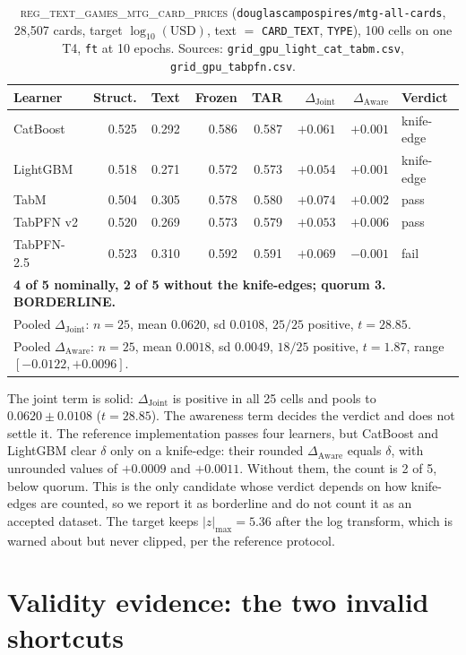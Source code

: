 \documentclass{article}
\newcommand{\djoint}{\Delta_{\text{Joint}}}
\newcommand{\daware}{\Delta_{\text{Aware}}}
\begin{document}
\begin{table}[H]
\centering\small
\caption{\textsc{reg\_text\_games\_mtg\_card\_prices} (\texttt{douglascampospires/mtg-all-cards},
28{,}507 cards, target $\log_{10}(\text{USD})$, text $=$ \texttt{CARD\_TEXT}, \texttt{TYPE}),
100 cells on one T4, \texttt{ft} at 10 epochs. Sources: \texttt{grid\_gpu\_light\_cat\_tabm.csv},
\texttt{grid\_gpu\_tabpfn.csv}.}
\begin{tabular}{lrrrrrrl}
\toprule
Learner & Struct. & Text & Frozen & TAR & $\djoint$ & $\daware$ & Verdict \\
\midrule
CatBoost   & 0.525 & 0.292 & 0.586 & 0.587 & $+0.061$ & $+0.001$ & knife-edge \\
LightGBM   & 0.518 & 0.271 & 0.572 & 0.573 & $+0.054$ & $+0.001$ & knife-edge \\
TabM       & 0.504 & 0.305 & 0.578 & 0.580 & $+0.074$ & $+0.002$ & pass \\
TabPFN v2  & 0.520 & 0.269 & 0.573 & 0.579 & $+0.053$ & $+0.006$ & pass \\
TabPFN-2.5 & 0.523 & 0.310 & 0.592 & 0.591 & $+0.069$ & $-0.001$ & fail \\
\midrule
\multicolumn{8}{l}{\textbf{4 of 5 nominally, 2 of 5 without the knife-edges; quorum 3. BORDERLINE.}} \\
\multicolumn{8}{l}{Pooled $\djoint$: $n{=}25$, mean $0.0620$, sd $0.0108$, $25/25$ positive, $t = 28.85$.} \\
\multicolumn{8}{l}{Pooled $\daware$: $n{=}25$, mean $0.0018$, sd $0.0049$, $18/25$ positive, $t = 1.87$, range $[-0.0122, +0.0096]$.} \\
\bottomrule
\end{tabular}
\end{table}

\noindent The joint term is solid: $\djoint$ is positive in all 25 cells and pools to
$0.0620 \pm 0.0108$ ($t = 28.85$). The awareness term decides the verdict and does not settle
it. The reference implementation passes four learners, but CatBoost and LightGBM clear $\delta$
only on a knife-edge: their rounded $\daware$ equals $\delta$, with unrounded values of
$+0.0009$ and $+0.0011$. Without them, the count is 2 of 5, below quorum. This is the only
candidate whose verdict depends on how knife-edges are counted, so we report it as borderline
and do not count it as an accepted dataset. The target keeps $|z|_{\max} = 5.36$ after the log
transform, which is warned about but never clipped, per the reference protocol.

\section{Validity evidence: the two invalid shortcuts}
\label{app:validity}
\end{document}
